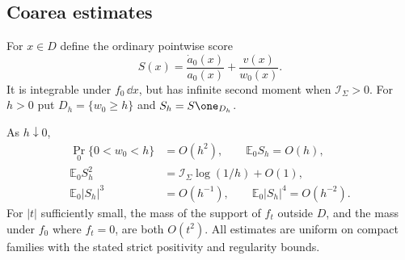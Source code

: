 \subsection{Coarea estimates}
For $x\in D$ define the ordinary pointwise score
\[
 S(x)=\frac{\dot a_0(x)}{a_0(x)}+\frac{v(x)}{w_0(x)}.
\]
It is integrable under $f_0\,\dd x$, but has infinite second moment
when $\mathcal I_\Sigma>0$. For $h>0$ put
$D_h=\{w_0\ge h\}$ and $S_h=S\one_{D_h}$.

\begin{lemma}\label{lem:v17-coarea}
As $h\downarrow0$,
\begin{align}
 \Pr_0\{0<w_0<h\}&=O(h^2),\qquad
                         \mathbb E_0 S_h=O(h),
                                           \label{eq:v17-strip}\\
 \mathbb E_0 S_h^2&=\mathcal I_\Sigma\log(1/h)+O(1),
                                           \label{eq:v17-score-two}\\
 \mathbb E_0|S_h|^3&=O(h^{-1}),\qquad
 \mathbb E_0|S_h|^4=O(h^{-2}).              \label{eq:v17-score-higher}
\end{align}
For $|t|$ sufficiently small, the mass of the support of $f_t$ outside
$D$, and the mass under $f_0$ where $f_t=0$, are both $O(t^2)$.
All estimates are uniform on compact families with the stated strict
positivity and regularity bounds.
\end{lemma}
